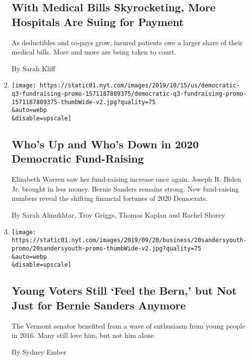 \begin{enumerate}
  \hypertarget{with-medical-bills-skyrocketing-more-hospitals-are-suing-for-payment}{%
  \subsection{With Medical Bills Skyrocketing, More Hospitals Are Suing
  for
  Payment}\label{with-medical-bills-skyrocketing-more-hospitals-are-suing-for-payment}}

  As deductibles and co-pays grow, insured patients owe a larger share
  of their medical bills. More and more are being taken to court.

  By Sarah Kliff
\item
  \href{/interactive/2019/10/16/us/elections/democratic-q3-fundraising.html}{}

  \texttt{[image: https://static01.nyt.com/images/2019/10/15/us/democratic-q3-fundraising-promo-1571187889375/democratic-q3-fundraising-promo-1571187889375-thumbWide-v2.jpg?quality=75\\\&auto=webp\\\&disable=upscale]}

  \hypertarget{whos-up-and-whos-down-in-2020-democratic-fund-raising}{%
  \subsection{Who's Up and Who's Down in 2020 Democratic
  Fund-Raising}\label{whos-up-and-whos-down-in-2020-democratic-fund-raising}}

  Elizabeth Warren saw her fund-raising increase once again. Joseph R.
  Biden Jr. brought in less money. Bernie Sanders remains strong. New
  fund-raising numbers reveal the shifting financial fortunes of 2020
  Democrats.

  By Sarah Almukhtar, Troy Griggs, Thomas Kaplan and Rachel Shorey
\item
  \href{/2019/09/20/us/politics/bernie-sanders-young-voters.html}{}

  \texttt{[image: https://static01.nyt.com/images/2019/09/20/business/20sandersyouth-promo/20sandersyouth-promo-thumbWide-v2.jpg?quality=75\\\&auto=webp\\\&disable=upscale]}

  \hypertarget{young-voters-still-feel-the-bern-but-not-just-for-bernie-sanders-anymore}{%
  \subsection{Young Voters Still `Feel the Bern,' but Not Just for
  Bernie Sanders
  Anymore}\label{young-voters-still-feel-the-bern-but-not-just-for-bernie-sanders-anymore}}

  The Vermont senator benefited from a wave of enthusiasm from young
  people in 2016. Many still love him, but not him alone.

  By Sydney Ember
\end{enumerate}

